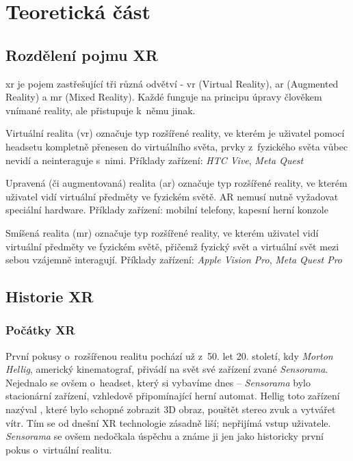 \part{Teoretická část}

\chapter{Rozdělení pojmu XR}

\gls{xr} je pojem zastřešující tři různá odvětví - \gls{vr} (Virtual Reality), \gls{ar} (Augmented Reality) a \gls{mr} (Mixed Reality). Každé funguje na principu úpravy člověkem vnímané reality, ale přistupuje k~němu jinak.

Virtuální realita (\gls{vr}) označuje typ rozšířené reality, ve kterém je uživatel pomocí headsetu kompletně přenesen do virtuálního světa, prvky z~fyzického světa vůbec nevidí a neinteraguje s~nimi. Příklady zařízení: \textit{HTC Vive}, \textit{Meta Quest}

Upravená (či augmentovaná) realita (\gls{ar}) označuje typ rozšířené reality, ve kterém uživatel vidí virtuální předměty ve fyzickém světě. AR nemusí nutně vyžadovat speciální hardware. Příklady zařízení: mobilní telefony, kapesní herní konzole

Smíšená realita (\gls{mr}) označuje typ rozšířené reality, ve kterém uživatel vidí virtuální předměty ve fyzickém světě, přičemž fyzický svět a virtuální svět mezi sebou vzájemně interagují. Příklady zařízení: \textit{Apple Vision Pro}, \textit{Meta Quest Pro} \cite{xr_disambiguation}

\chapter{Historie XR}

\section{Počátky XR}

První pokusy o~rozšířenou realitu pochází už z~50. let 20. století, kdy \textit{Morton Hellig}, americký kinematograf, přivádí na svět své zařízení zvané \textit{Sensorama}. Nejednalo se ovšem o~headset, který si vybavíme dnes -- \textit{Sensorama} bylo stacionární zařízení, vzhledově připomínající herní automat. Hellig toto zařízení nazýval , které bylo schopné zobrazit 3D obraz, pouštět stereo zvuk a vytvářet vítr. Tím se od dnešní XR technologie zásadně liší; nepřijímá vstup uživatele. \textit{Sensorama} se ovšem nedočkala úspěchu a známe ji jen jako historicky první pokus o~virtuální realitu. \cite{otechnice}


